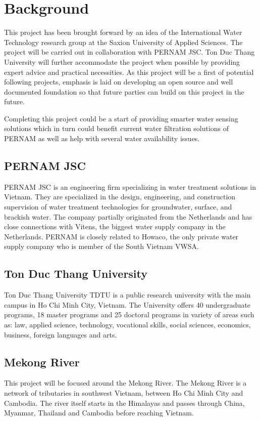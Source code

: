 \newpage
\section{Background}
This project has been brought forward by an idea of the International Water Technology research group at the Saxion University of Applied Sciences. The project will be carried out in collaboration with PERNAM \gls{JSC}. Ton Duc Thang University will further accommodate the project when possible by providing expert advice and practical necessities. As this project will be a first of potential following projects, emphasis is laid on developing an open source and well documented foundation so that future parties can build on this project in the future. 

Completing this project could be a start of providing smarter water sensing solutions which in turn could benefit current water filtration solutions of PERNAM as well as help with several water availability issues.

\subsection{PERNAM JSC}
PERNAM \gls{JSC} \cite{pernam} is an engineering firm specializing in water treatment solutions in Vietnam. They are specialized in the design, engineering, and construction supervision of water treatment technologies for groundwater, surface, and brackish water. The company partially originated from the Netherlands and has close connections with Vitens, the biggest water supply company in the Netherlands. PERNAM is closely related to Howaco, the only private water supply company who is member of the South Vietnam \gls{VWSA}.

\subsection{Ton Duc Thang University}
Ton Duc Thang University \gls{TDTU} \cite{tdtu} is a public research university with the main campus in Ho Chi Minh City, Vietnam. The University offers 40 undergraduate programs, 18 master programs and 25 doctoral programs in variety of areas such as: law, applied science, technology, vocational skills, social sciences, economics, business, foreign languages and arts. 

\subsection{Mekong River}
This project will be focused around the Mekong River. The Mekong River is a network of tributaries in southwest Vietnam, between Ho Chi Minh City and Cambodia. The river itself starts in the Himalayas and passes through China, Myanmar, Thailand and Cambodia before reaching Vietnam.

